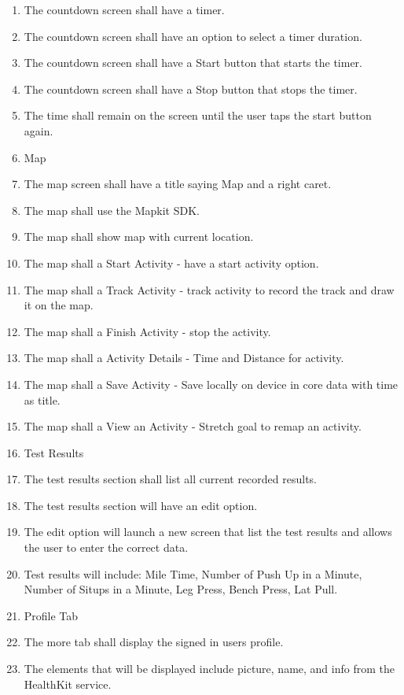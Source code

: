 \documentclass[letterpaper,10pt,titlepage]{article}
\begin{document}
\begin{enumerate}
\item The countdown screen shall have a timer.
\item The countdown screen shall have an option to select a timer duration.
\item The countdown screen shall have a Start button that starts the timer.
\item The countdown screen shall have a Stop button that stops the timer.
\item The time shall remain on the screen until the user taps the start button again.
\item Map
\item The map screen shall have a title saying Map and a right caret.
\item The map shall use the Mapkit SDK.
\item The map shall show map with current location.
\item The map shall a Start Activity - have a start activity option.
\item The map shall a Track Activity - track activity to record the track and draw it on the map.
\item The map shall a Finish Activity - stop the activity.
\item The map shall a Activity Details - Time and Distance for activity.
\item The map shall a Save Activity - Save locally on device in core data with time as title.
\item The map shall a View an Activity - Stretch goal to remap an activity.
\item Test Results
\item The test results section shall list all current recorded results.
\item The test results section will have an edit option.
\item The edit option will launch a new screen that list the test results and allows the user to enter the correct data.
\item Test results will include:  Mile Time, Number of Push Up in a Minute, Number of Situps in a Minute, Leg Press, Bench Press, Lat Pull.
\item Profile Tab
\item The more tab shall display the signed in users profile.
\item The elements that will be displayed include picture, name, and info from the HealthKit service.
\end{enumerate}
\end{document}
